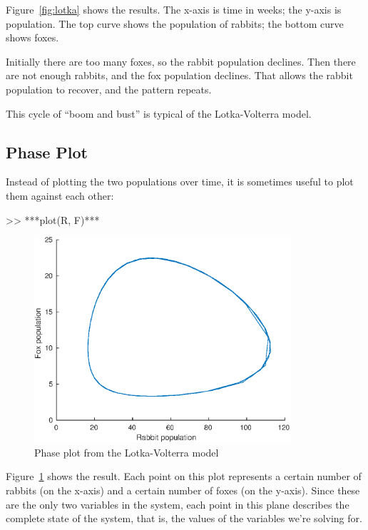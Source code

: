 Figure~\ref{fig:lotka} shows the results. The x-axis is time in weeks; the y-axis is population.  The top curve shows the population of rabbits; the bottom curve shows foxes.


Initially there are too many foxes, so the rabbit population declines.  Then there are not enough rabbits, and the fox population declines.  That allows the rabbit population to recover, and the pattern repeats.

This cycle of ``boom and bust'' is typical of the Lotka-Volterra model.


\subsection{Phase Plot}

Instead of plotting the two populations over time, it is sometimes useful to plot them against each other:

\begin{code}
>> ***plot(R, F)***
\end{code}

\begin{figure}[ht]
\centerline{\includegraphics[height=3in]{book/figs/phase.eps}}
\caption{Phase plot from the Lotka-Volterra model}
\label{fig:phase}
\end{figure}

Figure~\ref{fig:phase} shows the result.  
Each point on this plot represents a certain number of rabbits (on the
x-axis) and a certain number of foxes (on the y-axis).
Since these are the only two variables in the system, each point in
this plane describes the complete state of the system, that is, the values of
the variables we're solving for.


